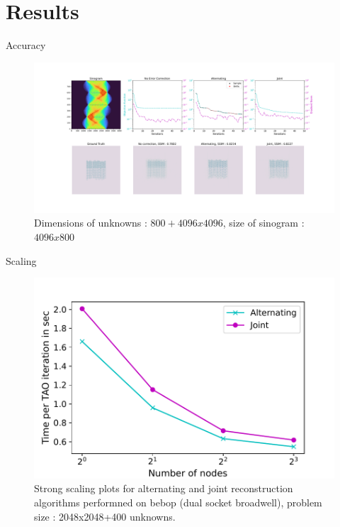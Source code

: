 \documentclass[aspectratio=43]{beamer}
\begin{document}
\section{Results}
\begin{frame}{Accuracy}
		\begin{center}
		\begin{figure}
			\vspace*{-0.75cm}\hspace*{-1.5cm}\includegraphics[scale=0.225]{figures/func_resd.pdf}
			\caption{Dimensions of unknowns : $800+4096x4096$, size of sinogram : $4096x800$}
		\end{figure}
	\end{center}
\end{frame}
\begin{frame}{Scaling}
	\begin{center}
		\begin{figure}
			\includegraphics[scale=0.6]{figures/basic_scaling.pdf}
			\caption{Strong scaling plots for alternating and joint reconstruction algorithms performned on bebop (dual socket broadwell), problem size : 2048x2048+400 unknowns.} 
		\end{figure}
	\end{center}
\end{frame}
\end{document}
